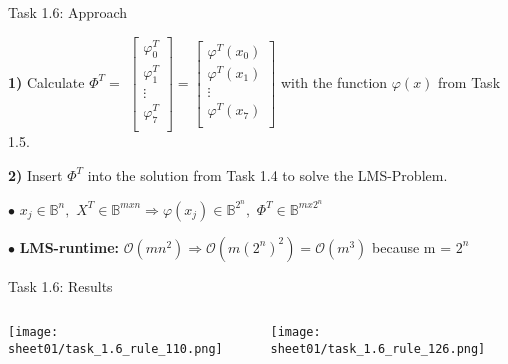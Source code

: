 \documentclass[aspectratio=169]{beamer}
\begin{document}
\begin{frame}{Task 1.6: Approach}

\textbf{1)} Calculate $\Phi^T = $
$\begin{bmatrix}
\varphi^T_0\\
\varphi^T_1\\
\vdots\\
\varphi^T_7\\
\end{bmatrix} =
\begin{bmatrix}
\varphi^T(x_0)\\
\varphi^T(x_1)\\
\vdots\\
\varphi^T(x_7)\\
\end{bmatrix}$
with the function $\varphi(x)$ from Task 1.5.\newline

\textbf{2)} Insert $\Phi^T$ into the solution from Task 1.4 to solve the LMS-Problem.\newline\newline

$\bullet$ $x_j \in \mathbb{B}^n,$ $X^T \in \mathbb{B}^{mxn}\Rightarrow \varphi(x_j) \in \mathbb{B}^{2^n},$ $\Phi^T \in \mathbb{B}^{mx2^n}$\newline

$\bullet$ \textbf{LMS-runtime:} $\mathcal{O}(mn^2)\Rightarrow \mathcal{O}(m(2^n)^2) = \mathcal{O}(m^{3})$ because m = $2^n$

\end{frame}

\begin{frame}{Task 1.6: Results}
\begin{columns}
    \begin{column}{0.5\textwidth}
        \texttt{[image: sheet01/task\_1.6\_rule\_110.png]}
    \end{column}
    \begin{column}{0.5\textwidth}
        \texttt{[image: sheet01/task\_1.6\_rule\_126.png]}
    \end{column}
\end{columns}
\end{frame}
\end{document}
